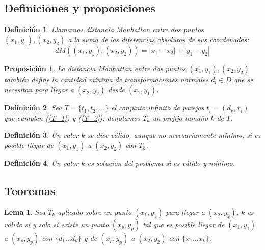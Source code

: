 \documentclass{article}
\theoremstyle{default}
\newtheorem*{lemma}{Lema}
\newtheorem*{proposition}{Proposición}
\newtheorem*{definition}{Definición}
\begin{document}
\subsection{Definiciones y proposiciones}
	\begin{definition}
		Llamamos distancia \textit{Manhattan} entre dos puntos $(x_1,y_1), (x_2,y_2)$ a la suma de las diferencias absolutas de sus coordenadas:
		\begin{equation*}
			dM((x_1,y_1),(x_2,y_2)) = |x_1 - x_2| + |y_1 - y_2|
		\end{equation*}
	\end{definition}
	\begin{proposition}
		La distancia \textit{Manhattan} entre dos puntos $(x_1,y_1), (x_2,y_2)$ también define la cantidad mínima de transformaciones normales $d_i \in D$ que se necesitan para llegar a $(x_2,y_2)$ desde $(x_1,y_1)$.
	\end{proposition}
	\begin{definition}
		Sea $T = \{t_1, t_2, \dots \}$ el conjunto infinito de parejas $t_i = (d_r, x_i)$ que cumplen (\ref{T_1}) y (\ref{T_2}), denotamos $T_k$ un prefijo tamaño $k$ de $T$.
	\end{definition}
	\begin{definition}
		Un valor $k$ se dice válido, aunque no necesariamente mínimo, si es posible llegar de $(x_1, y_1)$ a $(x_2, y_2)$ con $T_k$.
	\end{definition}
	\begin{definition}
		Un valor $k$ es solución del problema si es válido y mínimo.
	\end{definition}
%
%
\subsection{Teoremas}
	\begin{lemma}
		Sea $T_k$ aplicado sobre un punto $(x_1,y_1)$ para llegar a $(x_2,y_2)$, $k$ es válido si y solo si existe un punto $(x_p, y_p)$ tal que es posible llegar de $(x_1,y_1)$ a $(x_p, y_p)$ con $\{d_1 \dots d_k\}$ y de $(x_p, y_p)$ a $(x_2, y_2)$ con $\{x_1 \dots x_k\}$.
	\end{lemma}
\end{document}
